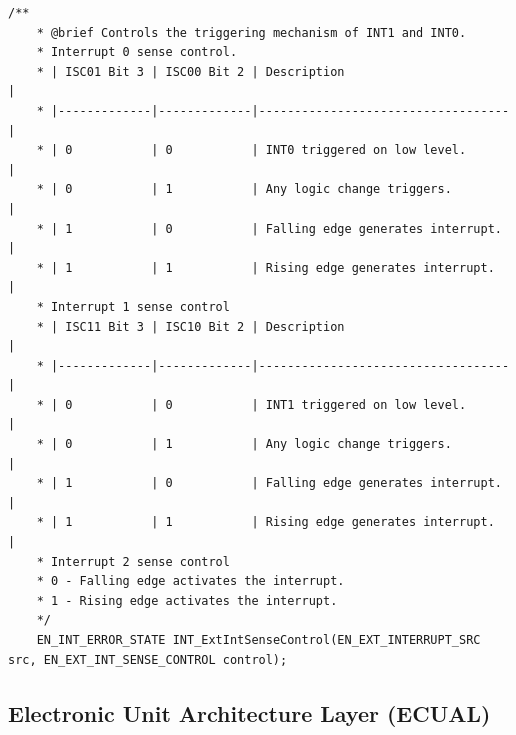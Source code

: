 \documentclass[10pt]{article}
\begin{document}
\begin{lstlisting}[style=CStyle,escapeinside=``]
	/**
	* @brief Controls the triggering mechanism of INT1 and INT0.
	* Interrupt 0 sense control.
	* | ISC01 Bit 3 | ISC00 Bit 2 | Description                       |
	* |-------------|-------------|-----------------------------------|
	* | 0           | 0           | INT0 triggered on low level.      |
	* | 0           | 1           | Any logic change triggers.        |
	* | 1           | 0           | Falling edge generates interrupt. |
	* | 1           | 1           | Rising edge generates interrupt.  |
	* Interrupt 1 sense control
	* | ISC11 Bit 3 | ISC10 Bit 2 | Description                       |
	* |-------------|-------------|-----------------------------------|
	* | 0           | 0           | INT1 triggered on low level.      |
	* | 0           | 1           | Any logic change triggers.        |
	* | 1           | 0           | Falling edge generates interrupt. |
	* | 1           | 1           | Rising edge generates interrupt.  |
	* Interrupt 2 sense control
	* 0 - Falling edge activates the interrupt.
	* 1 - Rising edge activates the interrupt.
	*/
	EN_INT_ERROR_STATE INT_ExtIntSenseControl(EN_EXT_INTERRUPT_SRC src, EN_EXT_INT_SENSE_CONTROL control);
\end{lstlisting}

\subsection{Electronic Unit Architecture Layer (ECUAL)}
\end{document}
